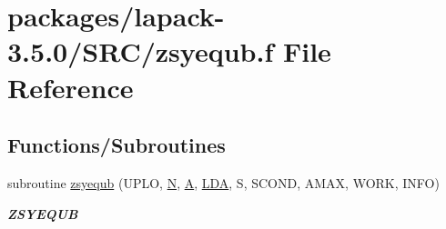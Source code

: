 \hypertarget{zsyequb_8f}{}\section{packages/lapack-\/3.5.0/\+S\+R\+C/zsyequb.f File Reference}
\label{zsyequb_8f}
\subsection*{Functions/\+Subroutines}
\begin{DoxyCompactItemize}
\item 
subroutine \hyperlink{group__complex16SYcomputational_ga0a5a0d65f60b7fd32e60cb95d9b414b4}{zsyequb} (U\+P\+L\+O, \hyperlink{polmisc_8c_a0240ac851181b84ac374872dc5434ee4}{N}, \hyperlink{classA}{A}, \hyperlink{example__user_8c_ae946da542ce0db94dced19b2ecefd1aa}{L\+D\+A}, S, S\+C\+O\+N\+D, A\+M\+A\+X, W\+O\+R\+K, I\+N\+F\+O)
\begin{DoxyCompactList}\small\item\em {\bfseries Z\+S\+Y\+E\+Q\+U\+B} \end{DoxyCompactList}\end{DoxyCompactItemize}

